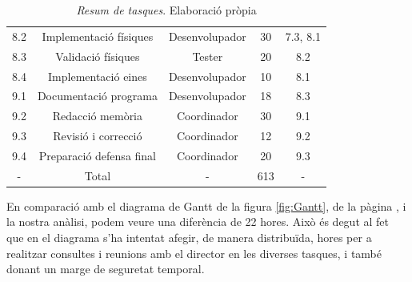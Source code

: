 \documentclass[a4paper]{article} %
\begin{document}
\begin{table}[h!]
\begin{tabular}{|| c || c | c | c c||}
			8.2 & Implementació físiques & Desenvolupador & 30 & 7.3, 8.1 \\
			8.3 & Validació físiques & Tester & 20 & 8.2 \\
			8.4 & Implementació eines & Desenvolupador & 10 & 8.1 \\
			\hline
			9.1 & Documentació programa & Desenvolupador & 18 & 8.3 \\
			9.2 & Redacció memòria & Coordinador & 30 & 9.1 \\
			9.3 & Revisió i correcció & Coordinador & 12 & 9.2 \\
			9.4 & Preparació defensa final & Coordinador & 20 & 9.3 \\
			\hline \hline
			- & Total & - & 613 & - \\
			\hline
		\end{tabular}
	\caption[\textit{Resum de tasques}]{\textit{\small Resum de tasques}. Elaboració pròpia}
	\label{table:resumTasques}
	\end{table}
	
	En comparació amb el diagrama de Gantt de la figura \ref{fig:Gantt}, de la pàgina \pageref{fig:Gantt}, i la nostra anàlisi, podem veure una diferència de 22 hores. Això és degut al fet que en el diagrama s'ha intentat afegir, de manera distribuïda, hores per a realitzar consultes i reunions amb el director en les diverses tasques, i també donant un marge de seguretat temporal.
	
	\newpage
\end{document}
